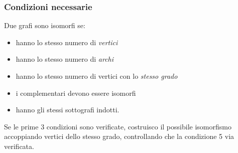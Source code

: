 \subsubsection{Condizioni necessarie}
Due grafi sono isomorfi se:
\begin{itemize}
\item hanno lo stesso numero di \emph{vertici}
\item hanno lo stesso numero di \emph{archi}
\item hanno lo stesso numero di vertici con lo \emph{stesso grado}
\item i complementari devono essere isomorfi
\item hanno gli stessi sottografi indotti.
\end{itemize} \par
Se le prime 3 condizioni sono verificate, costruisco il possibile isomorfismo accoppiando vertici dello
stesso grado, controllando che la condizione 5 via verificata. \\








\newpage
